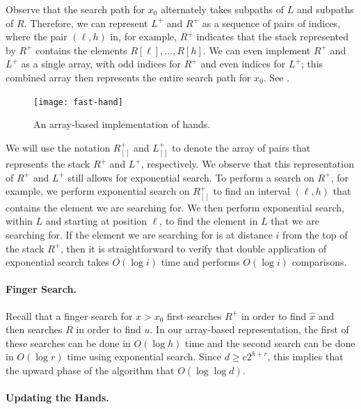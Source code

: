 \documentclass{patmorin}
\begin{document}
Observe that the search path for $x_0$ alternately takes subpaths of
$L$ and subpaths of $R$.  Therefore, we can represent $L^+$ and $R^+$
as a sequence of pairs of indices, where the pair $(\ell,h)$ in, for
example, $R^+$ indicates that the stack represented by $R^+$ contains the
elements $R[\ell],\ldots,R[h]$.  We can even implement $R^+$ and $L^+$
as a single array, with odd indices for $R^+$ and even indices for $L^+$;
this combined array then represents the entire search path for $x_0$. See
.

\begin{figure}
  \begin{center}
    \texttt{[image: fast-hand]}
  \end{center}
  \caption{An array-based implementation of hands.}
\end{figure}

We will use the notation $R^+_{[]}$ and $L^+_{[]}$ to denote the array
of pairs that represents the stack $R^+$ and $L^+$, respectively.
We observe that this representation of $R^+$ and $L^+$ still allows
for exponential search.  To perform a search on $R^+$, for example, we
perform exponential search on $R^+_{[]}$ to find an interval $(\ell,
h)$ that contains the element we are searching for.  We then perform
exponential search, within $L$ and starting at position $\ell$, to find
the element in $L$ that we are searching for.  If the element we are
searching for is at distance $i$ from the top of the stack $R^+$, then
it is straightforward to verify that double application of exponential
search takes $O(\log i)$ time and performs $O(\log i)$ comparisons.

\paragraph{Finger Search.}

Recall that a finger search for $x>x_0$ first searches $R^+$ in order
to find $\hat x$ and then searches $R$ in order to find $u$.  In our
array-based representation, the first of these searches can be done in
$O(\log h)$ time and the second search can be done in $O(\log r)$
time using exponential search.  Since $d\ge c2^{h+r}$, this implies that
the upward phase of the algorithm that $O(\log\log d)$.

\paragraph{Updating the Hands.}
\end{document}
